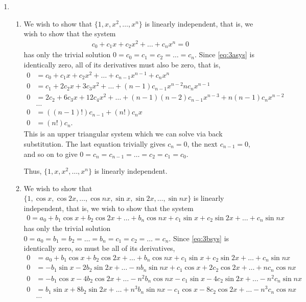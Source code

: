 \documentclass[10pt]{article}
\begin{document}
\begin{enumerate}
  \newpage
  \item \begin{enumerate}
    \item We wish to show that \(\{1, x, x^2, \dots , x^n\}\) is linearly independent, that is, we wish to show that the system \begin{align}\label{eq:3asys}
        c_0 + c_1x + c_2x^2 + \dots  + c_nx^n = 0
    \end{align} has only the trivial solution \(0 = c_0 = c_1 = c_2 = \dots  = c_n\).  Since \eqref{eq:3asys} is identically zero, all of its derivatives must also be zero, that is, \begin{align*}
        0 &= c_0 + c_1x + c_2x^2 + \dots  + c_{n-1}x^{n-1} + c_nx^n \\
        0 &= c_1 + 2c_2x + 3c_3x^2 + \dots + (n-1)c_{n-1}x^{n-2} nc_nx^{n-1} \\
        0 &= 2c_2 + 6c_3x + 12c_4x^2 + \dots + (n-1)(n-2)c_{n-1}x^{n-3} + n(n-1)c_nx^{n-2} \\
        &\dots \\
        0 &= ((n-1)!)c_{n-1} + (n!)c_nx\\
        0 &= (n!)c_n. 
    \end{align*} This is an upper triangular system which we can solve via back substitution. The last equation trivially gives \(c_n=0\), the next \(c_{n-1}=0\), and so on to give \(0 = c_n = c_{n-1} = \dots = c_2 = c_1 = c_0\).

    Thus, \(\{1, x, x^2, \dots , x^n\}\) is linearly independent.

    \item We wish to show that \(\{1, \cos  x, \cos  2x, \dots , \cos  nx, \sin  x, \sin  2x, \dots , \sin  nx\}\) is linearly independent, that is, we wish to show that the system \begin{align}\label{eq:3bsys}
        0 = a_0 + b_1\cos  x + b_2\cos  2x + \dots + b_n\cos nx + c_1\sin x + c_2 \sin  2x + \dots  + c_n \sin  nx   
    \end{align} has only the trivial solution \(0 = a_0 = b_1 = b_2 = \dots = b_n = c_1 = c_2 = \dots  = c_n\). Since \eqref{eq:3bsys} is identically zero, so must be all of its derivatives, \begin{align}
      0 &= a_0 + b_1\cos  x + b_2\cos  2x + \dots + b_n\cos nx + c_1\sin x + c_2 \sin  2x + \dots  + c_n \sin  nx \nonumber\\
      0 &= -b_1\sin  x  -2b_2\sin  2x + \dots  -nb_n\sin nx + c_1\cos x + 2c_2 \cos  2x + \dots  + nc_n \cos  nx \label{eq:d_1} \\
      0 &= - b_1\cos  x  -4b_2\cos  2x + \dots - n^2b_n\cos nx - c_1\sin x - 4c_2 \sin  2x + \dots  - n^2c_n \sin  nx \nonumber\\
      0 &= b_1\sin  x  + 8b_2\sin  2x + \dots  + n^3b_n\sin nx - c_1\cos x - 8c_2 \cos  2x + \dots  - n^3c_n \cos  nx \label{eq:d_2}\\
      &\dots \nonumber
    \end{align}


\end{enumerate}
\end{enumerate}
\end{document}

